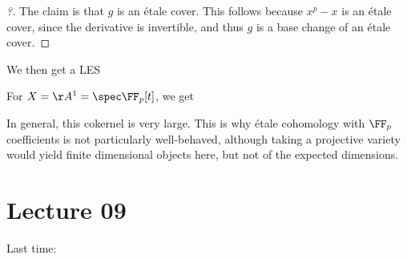 \begin{example}[?]
\begin{proof}[?]
The claim is that \(g\) is an étale cover. This follows because
\(x^p-x\) is an étale cover, since the derivative is invertible, and
thus \(g\) is a base change of an étale cover.

\end{proof}

We then get a LES

\begin{center}
\end{center}

For \(X = \AA^1 = \spec \FF_p[t]\), we get

\begin{center}
\end{center}

In general, this cokernel is very large. This is why étale cohomology
with \(\FF_p\) coefficients is not particularly well-behaved, although
taking a projective variety would yield finite dimensional objects here,
but not of the expected dimensions.

\end{example}

\hypertarget{lecture-09}{%
\section{Lecture 09}\label{lecture-09}}

Last time:

